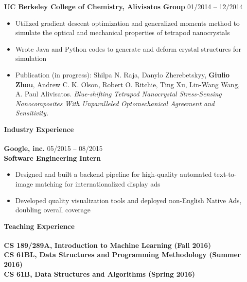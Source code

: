 \documentclass{article}
\begin{document}
\noindent
\textbf{UC Berkeley College of Chemistry, Alivisatos Group}
\hfill 01/2014 -- 12/2014
\begin{itemize}
\vspace{-1.8mm}
\item Utilized gradient descent optimization and generalized moments method to simulate the optical and mechanical properties of tetrapod nanocrystals
\vspace{-2.5mm}
\item Wrote Java and Python codes to generate and deform crystal structures for simulation
\vspace{-2.5mm}
\item Publication (in progress): Shilpa N. Raja, Danylo Zherebetskyy, \textbf{Giulio Zhou}, Andrew C. K. Olson, Robert O. Ritchie, Ting Xu, Lin-Wang Wang, A. Paul Alivisatos. \textit{Blue-shifting Tetrapod Nanocrystal Stress-Sensing Nanocomposites With Unparalleled Optomechanical Agreement and Sensitivity}.
\end{itemize}

\noindent
\textbf{{\Large Industry Experience}}\\[-2mm]
\HRule\\
\textbf{Google, inc.}
\hfill 05/2015 -- 08/2015\\
\textbf{Software Engineering Intern}
\begin{itemize}
\vspace{-1.8mm}
\item Designed and built a backend pipeline for high-quality automated text-to-image matching for internationalized display ads
\vspace{-2.5mm}
\item Developed quality visualization tools and deployed non-English Native Ads, doubling overall coverage
\end{itemize}
\vspace{1mm}


\noindent
\textbf{{\Large Teaching Experience}}\\[-2mm]
\HRule\\
\textbf{CS 189/289A, Introduction to Machine Learning (Fall 2016)} \\
\textbf{CS 61BL, Data Structures and Programming Methodology (Summer 2016)} \\
\textbf{CS 61B, Data Structures and Algorithms (Spring 2016)} \\
\end{document}
